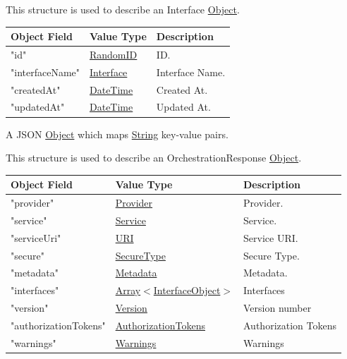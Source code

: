 \documentclass[a4paper]{arrowhead}
\newcommand{\mref}[1]{{\textcolor{ArrowheadPurple}{\hyperref[sec:model:#1]{#1}}}}
\newcommand{\pref}[1]{{\textcolor{ArrowheadGrey}{\hyperref[sec:model:primitives:#1]{#1}}}}
\begin{document}

This structure is used to describe an Interface \pref{Object}.

\begin{table}[ht!]
\begin{tabularx}{\textwidth}{| p{5cm} | p{6cm} | X |} \hline
\rowcolor{gray!33} Object Field & Value Type      & Description \\ \hline
"id"                 & \pref{RandomID} & ID. \\ \hline
"interfaceName"      & \pref{Interface}   & Interface Name. \\ \hline
"createdAt"          & \pref{DateTime} & Created At. \\ \hline
"updatedAt"          & \pref{DateTime} & Updated At. \\ \hline

\end{tabularx}
\end{table}


A JSON \pref{Object} which maps \pref{String} key-value pairs.


This structure is used to describe an OrchestrationResponse \pref{Object}. 

\begin{table}[ht!]
\begin{tabularx}{\textwidth}{| p{5cm} | p{3.5cm} | X |} \hline
\rowcolor{gray!33} Object Field & Value Type               & Description \\ \hline
"provider"            & \pref{Provider}                    & Provider. \\ \hline
"service"             & \pref{Service}                     & Service. \\ \hline
"serviceUri"          & \pref{URI}                         & Service URI. \\ \hline
"secure"              & \pref{SecureType}                  & Secure Type. \\ \hline
"metadata"            & \pref{Metadata}                    & Metadata. \\ \hline 
"interfaces"          & \pref{Array}$<$\mref{InterfaceObject}$>$ & Interfaces \\ \hline
"version"             & \pref{Version}                     & Version number \\ \hline
"authorizationTokens" & \pref{AuthorizationTokens}         & Authorization Tokens \\ \hline 
"warnings"            & \pref{Warnings}                    & Warnings \\ \hline

\end{tabularx}
\end{table}
\end{document}
